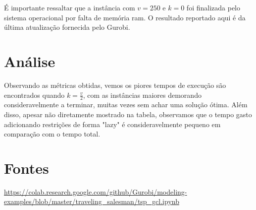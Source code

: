 \documentclass[11pt]{article}
\theoremstyle{definition}
\theoremstyle{definition}
\theoremstyle{remark}
\theoremstyle{remark}
\theoremstyle{remark}
\theoremstyle{remark}
\theoremstyle{definition}
\begin{document}
É importante ressaltar que a instância com \(v=250\) e \(k=0\) foi finalizada pelo sistema operacional por falta de memória ram. O resultado reportado aqui é da última atualização fornecida pelo Gurobi.

\section*{Análise}
\label{sec:org7143c1c}
Observando as métricas obtidas, vemos os piores tempos de execução são encontrados quando \(k = \frac{v}{2}\), com as instâncias maiores demorando consideravelmente a terminar, muitas vezes sem achar uma solução ótima. Além disso, apesar não diretamente mostrado na tabela, observamos que o tempo gasto adicionando restrições de forma "lazy" é consideravelmente pequeno em comparação com o tempo total.
\section*{Fontes}
\label{sec:org013517e}
\url{https://colab.research.google.com/github/Gurobi/modeling-examples/blob/master/traveling\_salesman/tsp\_gcl.ipynb}
\end{document}
